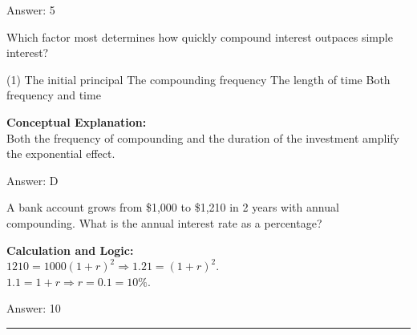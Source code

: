 \documentclass[11pt,paper=a4,answers]{exam}
\begin{document}
\begin{questions}
\begin{solution}
\vspace{30pt}

Answer: \colorbox{yellow!100}{5}
\end{solution}

\vspace{60pt}

\question
Which factor most determines how quickly compound interest outpaces simple interest?
\begin{tasks}(1)
    \task The initial principal
    \task The compounding frequency
    \task The length of time
    \task Both frequency and time
\end{tasks}

\begin{solution}
\textbf{Conceptual Explanation:} \\
Both the frequency of compounding and the duration of the investment amplify the exponential effect.

\vspace{30pt}

Answer: \colorbox{yellow!100}{D}
\end{solution}

\vspace{60pt}

\question
A bank account grows from \$1,000 to \$1,210 in 2 years with annual compounding. What is the annual interest rate as a percentage?

\begin{solution}
\textbf{Calculation and Logic:} \\
$1210 = 1000(1+r)^2 \Rightarrow 1.21 = (1+r)^2$. \\
$1.1 = 1+r \Rightarrow r = 0.1 = 10\%$.

\vspace{30pt}

Answer: \colorbox{yellow!100}{10}
\end{solution}


\end{questions}
\begin{center}
\rule{.5\textwidth}{1pt}
\end{center}
\end{document}
